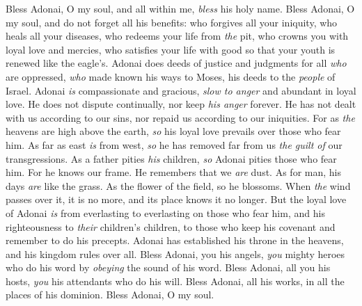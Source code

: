 \begin{biblechapter} %
 Bless Adonai, O my soul, 
and all within me, \textit{bless} his holy name.
\verse Bless Adonai, O my soul, 
and do not forget all his benefits:
\verse who forgives all your iniquity, 
who heals all your diseases,
\verse who redeems your life from \textit{the} pit, 
who crowns you with loyal love and mercies,
\verse who satisfies your life with good 
so that your youth is renewed like the eagle’s.
\verse Adonai does deeds of justice 
and judgments for all \textit{who} are oppressed,
\verse \textit{who} made known his ways to Moses, 
his deeds to the \textit{people} of Israel.
\verse Adonai \textit{is} compassionate and gracious, 
\textit{slow to anger} and abundant in loyal love.
\verse He does not dispute continually, 
nor keep \textit{his anger} forever.
\verse He has not dealt with us according to our sins, 
nor repaid us according to our iniquities.
\verse For as \textit{the} heavens are high above the earth, 
\textit{so} his loyal love prevails over those who fear him.
\verse As far as east \textit{is} from west, 
\textit{so} he has removed far from us \textit{the guilt of} our transgressions.
\verse As a father pities \textit{his} children, 
\textit{so} Adonai pities those who fear him.
\verse For he knows our frame. 
He remembers that we \textit{are} dust.
\verse As for man, his days \textit{are} like the grass. 
As the flower of the field, so he blossoms.
\verse When \textit{the} wind passes over it, it is no more, 
and its place knows it no longer.
\verse But the loyal love of Adonai 
\textit{is} from everlasting to everlasting on those who fear him, 
and his righteousness to \textit{their} children’s children,
\verse to those who keep his covenant 
and remember to do his precepts.
\verse Adonai has established his throne in the heavens, 
and his kingdom rules over all.
\verse Bless Adonai, you his angels, 
\textit{you} mighty heroes who do his word 
by \textit{obeying} the sound of his word.
\verse Bless Adonai, all you his hosts, 
\textit{you} his attendants who do his will.
\verse Bless Adonai, all his works, 
in all the places of his dominion. 
Bless Adonai, O my soul.
\end{biblechapter}

